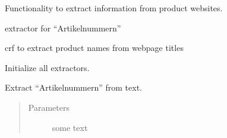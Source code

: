 \documentclass[letterpaper,10pt,english]{sphinxmanual}
\begin{document}
\begin{fulllineitems}
\label{\detokenize{api:information_extractor.InformationExtractor}}
Functionality to extract information from product websites.

\begin{fulllineitems}
\label{\detokenize{api:information_extractor.InformationExtractor.anr}}
extractor for “Artikelnummern”

\end{fulllineitems}


\begin{fulllineitems}
\label{\detokenize{api:information_extractor.InformationExtractor.pr_name}}
crf to extract product names from webpage titles

\end{fulllineitems}


\begin{fulllineitems}
\label{\detokenize{api:information_extractor.InformationExtractor.__init__}}
Initialize all extractors.

\end{fulllineitems}


\begin{fulllineitems}
\label{\detokenize{api:information_extractor.InformationExtractor.extract_artikelnummer}}
Extract “Artikelnummern” from text.
\begin{quote}\begin{description}
\item[{Parameters}] \leavevmode
{} \textendash{} some text

\end{description}\end{quote}


\end{fulllineitems}
\end{fulllineitems}
\end{document}
